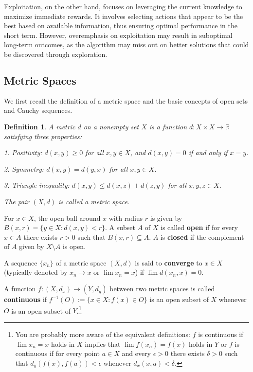 \documentclass[letter,11pt]{article}
\newtheorem{definition}{Definition}[section]
\begin{document}
Exploitation, on the other hand, focuses on leveraging the current knowledge to maximize immediate rewards. It involves selecting actions that appear to be the best based on available information, thus ensuring optimal performance in the short term. However, overemphasis on exploitation may result in suboptimal long-term outcomes, as the algorithm may miss out on better solutions that could be discovered through exploration.




\newpage 

\subsection{Metric Spaces} \label{Sec:metricspace}
We first recall the definition of a metric space and the basic concepts of open sets and Cauchy sequences. 

\begin{definition}
    A metric $d$ on a nonempty set $X$ is a function $d:X \times X \rightarrow \mathbb{R}$ satisfying three properties:

    1. Positivity: $d(x,y) \geq 0$ for all $x,y \in X$, and $d(x,y)=0$ if and only if $x=y$. 

    2. Symmetry: $d(x,y) = d(y,x)$ for all $x,y \in X$. 

    3. Triangle inequality: $d(x,y) \leq d(x,z) + d(z,y)$ for all $x,y,z \in X$. 

    The pair $(X,d)$ is called a metric space. 
\end{definition}




For $x \in X$, the open ball around $x$ with radius $r$ is given by $B(x,r) = \{y \in X: d(x,y) < r \}$. A subset $A$ of $X$ is called \textbf{open} if for every $x \in A$ there exists $r>0$ such that $B(x,r) \subseteq A$. $A$ is \textbf{closed} if the complement of $A$ given by $X \setminus A$ is open. 

A sequence  $\{x_{n}\}$ of a metric space $(X,d)$ is said to \textbf{converge}  to $x \in X$ (typically denoted by $x_{n} \rightarrow x$ or $\lim x_{n} = x$) if $ \lim d(x_{n},x) =0$. 

A function $f:(X,d_{x}) \rightarrow (Y,d_{y})$ between two metric spaces is called \textbf{continuous} if $f^{-1} (O)  := \{ x \in X : f(x) \in O \}$ is an open subset of $X$ whenever $O$ is an open subset of $Y$.\footnote{You are probably more aware of  the equivalent definitions: $f$ is continuous if $\lim x_{n} = x$ holds in $X$ implies that $\lim f(x_{n}) = f(x)$ holds in $Y$ or $f$ is continuous if for every point $a \in X$ and every $\epsilon >0$ there exists $\delta >0$ such that $d_{y} (f(x) , f(a) ) < \epsilon$ whenever $d_{x}(x,a) < \delta$.} 
\end{document}
